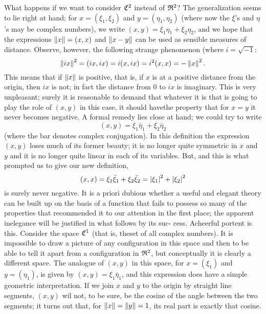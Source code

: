 What happens if we want to consider \(\frak{C}^2\) instead of \(\frak{R}^2\)? The
generalization seems to lie right at hand; for \(x = (\xi_1, \xi_2)\) and \(y =
(\eta_1, \eta_2)\) (where now the \(\xi\)'s and \(\eta\)'s may be complex
numbers), we write \((x, y) = \xi_1\eta_1 + \xi_2\eta_2\), and we hope that the
expressions \(\left\lVert x\right\rVert = (x, x)\) and \(\left\lVert x -y\right\rVert\) can be used as sensible
measures of distance. Observe, however, the following strange phenomenon (where
\(i = \sqrt{-1}\):
\begin{equation*}
    \left\lVert ix\right\rVert^2 = (ix, ix) = i(x, ix) = i^2(x, x) = - \left\lVert x\right\rVert^2.
\end{equation*}
This means that if \(\left\lVert x\right\rVert\) is positive, that is, if \(x\) is at a positive
distance from the origin, then \(ix\) is not; in fact the distance from \(0\) to
\(ix\) is imaginary. This is very unpleasant; surely it is reasonable to demand
that whatever it is that is going to play the role of \((x, y)\) in this case,
it should havethe property that for \(x = y\) it never becomes negative. A
formal remedy lies close at hand; we could try to write
\begin{equation*}
    (x,y) = \xi_1\bar{\eta}_1 + \xi_2\bar{\eta}_2
\end{equation*}
(where the bar denotes complex conjugation). In this definition the expression
\((x, y)\) loses much of its former beauty; it is no longer quite symmetric in
\(x\) and \(y\) and it is no longer quite linear in each of its variables. But,
and this is what prompted us to give our new definition,
\begin{equation*}
    (x, x) = \xi_1\bar{\xi}_1 + \xi_2\bar{\xi}_2 = \left\lvert\xi_1\right\rvert^2 + \left\lvert\xi_2\right\rvert^2
\end{equation*}
is surely never negative. It is a priori dubious whether a useful and elegant
theory can be built up on the basis of a function that fails to possess so many
of the properties that recommended it to our attention in the first place; the
apparent inelegance will be justified in what follows by its suc- cess.
Acheerful portent is this. Consider the space \(\frak{C}^1\) (that is, theset of
all complex numbers). It is impossible to draw a picture of any configuration in
this space and then to be able to tell it apart from a configuration in
\(\frak{R}^2\), but conceptually it is clearly a different space. The analogue of
\((x,y)\) in this space, for \(x = (\xi_1)\) and \(y = (\eta_1)\), is given by
\((x, y) = \xi_1\bar{\eta}_1\), and this expression does have a simple geometric
interpretation. If we join \(x\) and \(y\) to the origin by straight line
segments, \((x,y)\) wil not, to be sure, be the cosine of the angle between the
two segments; it turns out that, for \(\left\lVert x\right\rVert = \left\lVert y\right\rVert = 1\), its real part
is exactly that cosine.

